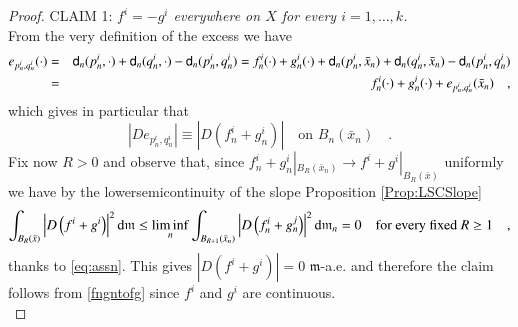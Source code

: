 \documentclass[11pt,reqno]{amsart}
\newcommand{\mm}{\mathfrak m}
\newcommand{\sfd}{{\sf d}}
\renewcommand{\d}{{\rm{d}}}
\theoremstyle{definition}
\theoremstyle{remark}
\theoremstyle{remark}
\theoremstyle{remark}
\theoremstyle{remark}
\theoremstyle{remark}
\theoremstyle{remark}
\theoremstyle{remark}
\begin{document}
\begin{proof}
CLAIM 1: \emph{$f^i=-g^i$ everywhere on $X$ for every $i=1,\ldots, k$.}
\\From the very definition of the excess we have
\begin{eqnarray}
e_{p^i_n,q^i_n}(\cdot)&=&\sfd_n(p^i_n, \cdot)+\sfd_n(q^i_n, \cdot)-\sfd_n(p^i_n,q^i_n)=f^i_n(\cdot)+g^i_n(\cdot)+\sfd_n(p^i_n,\bar{x}_n)+\sfd_n(q^i_n,\bar{x}_n)-\sfd_n(p^i_n,q^i_n)\nonumber \\
&=& f^i_n(\cdot)+g^i_n(\cdot)+e_{p^i_n,q^i_n}(\bar{x}_n) \quad , \label{eq:efg}
\end{eqnarray}
which gives  in particular that
\begin{equation}\label{eq:DeDfg}
|D e_{p^i_n,q^i_n}| \equiv |D(f^i_n+g^i_n)| \quad \text{on } B_n(\bar{x}_n)\quad. 
\end{equation}
Fix now $R>0$ and observe that, since $f^i_n+g^i_n|_{B_R(\bar{x}_n)}\to f^i+g^i|_{B_R(\bar{x})} $ uniformly  we have by the lowersemicontinuity of the slope Proposition \ref{Prop:LSCSlope}
$$
\int_{B_R(\bar{x})} \left|D\left( f^i+g^i   \right) \right|^2 \d\mm \leq  \liminf_n  \int_{B_{R+1}(\bar{x}_n)} \left|D\left( f^i_n+g^j_n \right) \right|^2 \d\mm_n =0 \quad \text{for every fixed } R\geq 1 \quad, $$
thanks to  \eqref{eq:assn}. This gives $|D(f^i+g^i)|=0$ $\mm$-a.e. and therefore the claim follows from  \eqref{fngntofg} since $f^i$ and $g^i$ are continuous.
\\


\end{proof}
\end{document}
